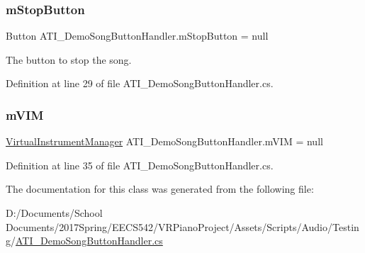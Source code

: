 \subsubsection{\texorpdfstring{m\+Stop\+Button}{mStopButton}}
{\footnotesize\ttfamily Button A\+T\+I\+\_\+\+Demo\+Song\+Button\+Handler.\+m\+Stop\+Button = null\hspace{0.3cm}{\ttfamily [private]}}



The button to stop the song. 



Definition at line 29 of file A\+T\+I\+\_\+\+Demo\+Song\+Button\+Handler.\+cs.

\mbox{\label{class_a_t_i___demo_song_button_handler_ac078f283ce74a7b310ebb2cbbc55f70b}} 
\subsubsection{\texorpdfstring{m\+V\+IM}{mVIM}}
{\footnotesize\ttfamily \hyperlink{class_virtual_instrument_manager}{Virtual\+Instrument\+Manager} A\+T\+I\+\_\+\+Demo\+Song\+Button\+Handler.\+m\+V\+IM = null\hspace{0.3cm}{\ttfamily [private]}}



Definition at line 35 of file A\+T\+I\+\_\+\+Demo\+Song\+Button\+Handler.\+cs.



The documentation for this class was generated from the following file\+:\begin{DoxyCompactItemize}
\item 
D\+:/\+Documents/\+School Documents/2017\+Spring/\+E\+E\+C\+S542/\+V\+R\+Piano\+Project/\+Assets/\+Scripts/\+Audio/\+Testing/\hyperlink{_a_t_i___demo_song_button_handler_8cs}{A\+T\+I\+\_\+\+Demo\+Song\+Button\+Handler.\+cs}\end{DoxyCompactItemize}
